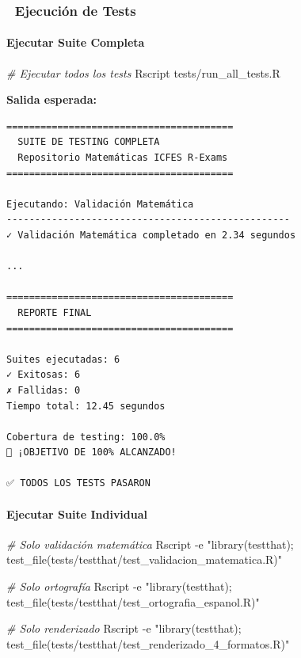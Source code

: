 \documentclass[
]{article}
\newenvironment{Shaded}{\begin{snugshade}}{\end{snugshade}}
\newcommand{\AttributeTok}[1]{\textcolor[rgb]{0.13,0.29,0.53}{#1}}
\newcommand{\CommentTok}[1]{\textcolor[rgb]{0.56,0.35,0.01}{\textit{#1}}}
\newcommand{\ExtensionTok}[1]{#1}
\newcommand{\NormalTok}[1]{#1}
\newcommand{\StringTok}[1]{\textcolor[rgb]{0.31,0.60,0.02}{#1}}
\begin{document}
\subsubsection{🚀 Ejecución de Tests}\label{ejecuciuxf3n-de-tests}

\paragraph{Ejecutar Suite Completa}\label{ejecutar-suite-completa}

\begin{Shaded}
\begin{Highlighting}[]
\CommentTok{\# Ejecutar todos los tests}
\ExtensionTok{Rscript}\NormalTok{ tests/run\_all\_tests.R}
\end{Highlighting}
\end{Shaded}

\textbf{Salida esperada:}

\begin{verbatim}
========================================
  SUITE DE TESTING COMPLETA
  Repositorio Matemáticas ICFES R-Exams
========================================

Ejecutando: Validación Matemática
--------------------------------------------------
✓ Validación Matemática completado en 2.34 segundos

...

========================================
  REPORTE FINAL
========================================

Suites ejecutadas: 6
✓ Exitosas: 6
✗ Fallidas: 0
Tiempo total: 12.45 segundos

Cobertura de testing: 100.0%
🎉 ¡OBJETIVO DE 100% ALCANZADO!

✅ TODOS LOS TESTS PASARON
\end{verbatim}

\paragraph{Ejecutar Suite Individual}\label{ejecutar-suite-individual}

\begin{Shaded}
\begin{Highlighting}[]
\CommentTok{\# Solo validación matemática}
\ExtensionTok{Rscript} \AttributeTok{{-}e} \StringTok{"library(testthat); test\_file(\textquotesingle{}tests/testthat/test\_validacion\_matematica.R\textquotesingle{})"}

\CommentTok{\# Solo ortografía}
\ExtensionTok{Rscript} \AttributeTok{{-}e} \StringTok{"library(testthat); test\_file(\textquotesingle{}tests/testthat/test\_ortografia\_espanol.R\textquotesingle{})"}

\CommentTok{\# Solo renderizado}
\ExtensionTok{Rscript} \AttributeTok{{-}e} \StringTok{"library(testthat); test\_file(\textquotesingle{}tests/testthat/test\_renderizado\_4\_formatos.R\textquotesingle{})"}
\end{Highlighting}
\end{Shaded}
\end{document}
